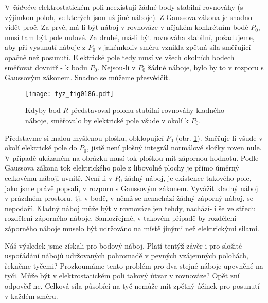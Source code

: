   V \emph{žádném} elektrostatickém poli neexistují žádné body stabilní rovnováhy (s výjimkou poloh,
  ve kterých jsou už jiné náboje). Z Gaussova zákona je snadno vidět proč. Za prvé, má-li být náboj
  v rovnováze v nějakém konkrétním bodě \(P_0\), musí tam být pole nulové. Za druhé, má-li být
  rovnováha stabilní, požadujeme, aby při vysunutí náboje z \(P_0\) v jakémkoliv směru vznikla
  zpětná síla směřující opačně než posunutí. Elektrické pole tedy musí ve všech okolních bodech
  směřovat dovnitř - k bodu \(P_0\). Nejsou-li v \(P_0\) žádné náboje, bylo by to v rozporu s
  Gaussovým zákonem. Snadno se  můžeme přesvědčit.

  \begin{figure}[ht!] %
    \centering
    \texttt{[image: fyz\_fig0186.pdf]}
    \caption{Kdyby bod \(R\) představoval polohu stabilní rovnováhy kladného náboje, směřovalo  
      by elektrické pole všude v okolí k \(P_0\).}
    \label{fyz:fig0186}
  \end{figure}
  Představme si malou myšlenou plošku, obklopující \(P_0\) (obr. \ref{fyz:fig0186}). Směřuje-li všude
  v okolí elektrické pole do \(P_0\), jistě není plošný integrál normálové složky roven nule. V
  případě ukázaném na obrázku musí tok ploškou mít zápornou hodnotu. Podle Gaussova zákona tok
  elektrického pole z libovolné plochy je přímo úměrný celkovému náboji uvnitř. Není-li v \(P_0\)
  žádný náboj, je existence takového pole, jako jsme právě popsali, v rozporu s Gaussovým zákonem.
  Vyvážit kladný náboj v prázdném prostoru, tj. v bodě, v němž se nenachází žádný záporný náboj, se
  nepodaří. Kladný náboj může být v rovnováze jen tehdy, nachází-li še ve středu rozdělení záporného
  náboje. Samozřejmě, v takovém případě by rozdělení záporného náboje muselo být udržováno na místě
  jinými než elektrickými silami.
       
  Náš výsledek jsme získali pro bodový náboj. Platí tentýž závěr i pro složité uspořádání nábojů
  udržovaných pohromadě v pevných vzájemných polohách, řekněme tyčemi? Prozkoumáme tento problém pro
  dva stejné náboje upevněné na tyči. Může být v elektrostatickém poli takový útvar v rovnováze?
  Opět zní odpověď ne. Celková síla působící na tyč nemůže mít zpětný účinek pro posunutí v každém
  směru.
  
